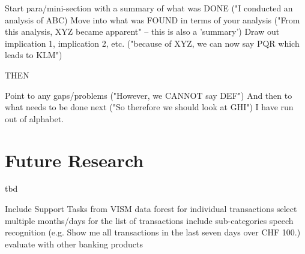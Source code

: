 Start para/mini-section with a summary of what was DONE ("I conducted an analysis of ABC)
Move into what was FOUND in terms of your analysis ("From this analysis, XYZ became apparent" -- this is also a 'summary')
Draw out implication 1, implication 2, etc. ("because of XYZ, we can now say PQR which leads to KLM")

THEN

Point to any gaps/problems ("However, we CANNOT say DEF")
And then to what needs to be done next ("So therefore we should look at GHI")
I have run out of alphabet.





\section{Future Research}

tbd


Include Support Tasks from VISM \newline
data forest for individual transactions \newline
select multiple months/days for the list of transactions \newline
include sub-categories \newline
speech recognition (e.g. Show me all transactions in the last seven days over CHF 100.) \newline
evaluate with other banking products  \newline
